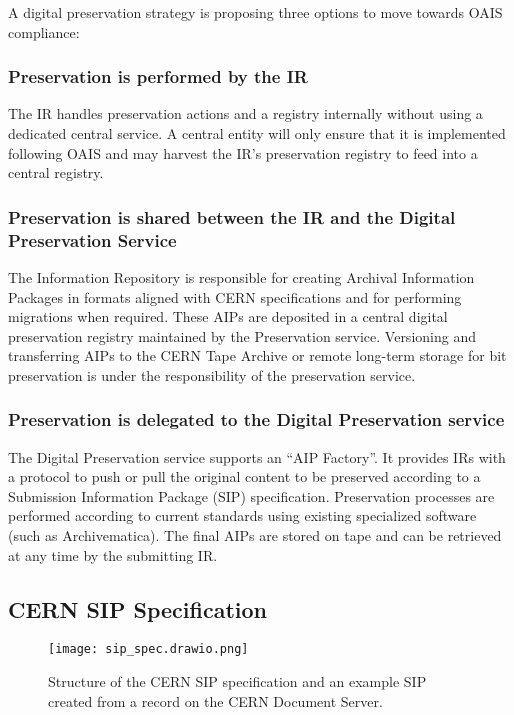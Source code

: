 \documentclass[11pt]{IEEEtran}
\begin{document}
A digital preservation strategy\cite{strategy} is proposing three options to move towards OAIS compliance:

\subsubsection{Preservation is performed by the IR} The IR handles preservation actions and a registry internally without using a dedicated central service. A central entity will only ensure that it is implemented following OAIS and may harvest the IR's preservation registry to feed into a central registry.

\subsubsection{Preservation is shared between the IR and the Digital Preservation Service}

The Information Repository is responsible for creating Archival Information Packages in formats aligned with CERN specifications and for performing migrations when required. These AIPs are deposited in a central digital preservation registry maintained by the Preservation service. Versioning and transferring AIPs to the CERN Tape Archive or remote long-term storage for bit preservation is under the responsibility of the preservation service.

\subsubsection{Preservation is delegated to the Digital Preservation service}

The Digital Preservation service supports an “AIP Factory”. It provides IRs with a protocol to push or pull the original content to be preserved according to a Submission Information Package (SIP) specification. Preservation processes are performed according to current standards using existing specialized software (such as Archivematica). The final AIPs are stored on tape and can be retrieved at any time by the submitting IR.

\subsection{CERN SIP Specification}

\begin{figure}
    \texttt{[image: sip\_spec.drawio.png]}
    \caption{Structure of the CERN SIP specification and an example SIP created from a record on the CERN Document Server.}
\end{figure}
\end{document}
